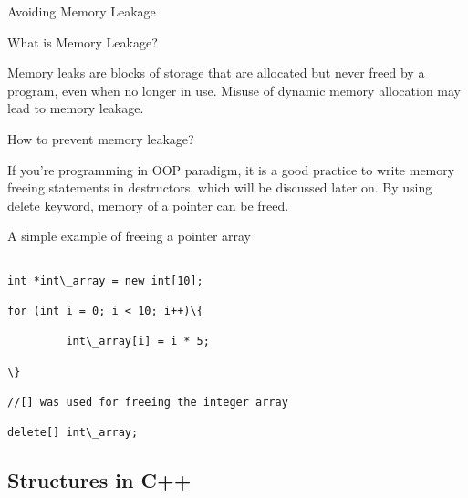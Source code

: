 \documentclass[newPxFont]{beamer}
\begin{document}
\begin{frame}[allowframebreaks]{Avoiding Memory Leakage}

\begin{exampleblock}{What is Memory Leakage?}

Memory leaks are blocks of storage that are allocated but never freed by a program, even when no longer in use. Misuse of dynamic memory allocation may lead to memory leakage.

\end{exampleblock}

\begin{alertblock}{How to prevent memory leakage?}

If you're programming in OOP paradigm, it is a good practice to write memory freeing statements in destructors, which will be discussed later on. By using \alert{delete} keyword, memory of a pointer can be freed.


\end{alertblock}

A simple example of freeing a pointer array

\begin{verbatim}

int *int\_array = new int[10];

for (int i = 0; i < 10; i++)\{

         int\_array[i] = i * 5;
    
\}

//[] was used for freeing the integer array

delete[] int\_array;

\end{verbatim}

\end{frame}

\subsection{Structures in C++}
\end{document}
